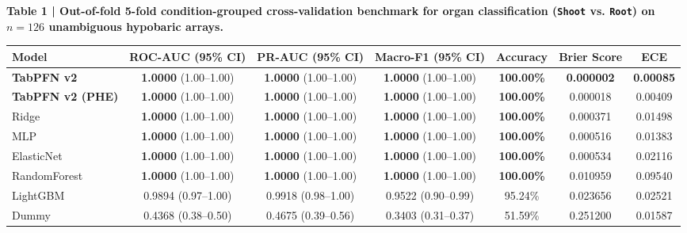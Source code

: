 \documentclass[10pt,a4paper]{article}
\begin{document}
\begin{center}
\small
\textbf{\textsf{Table 1 \;|\; Out-of-fold 5-fold condition-grouped cross-validation benchmark for organ classification (\texttt{Shoot} vs. \texttt{Root}) on $n = 126$ unambiguous hypobaric arrays.}}\\[6pt]
\begin{tabular}{lcccccc}
\toprule
\textbf{Model} & \textbf{ROC-AUC} (95\% CI) & \textbf{PR-AUC} (95\% CI) & \textbf{Macro-F1} (95\% CI) & \textbf{Accuracy} & \textbf{Brier Score} & \textbf{ECE} \\
\midrule
\textbf{TabPFN v2} & \textbf{1.0000} (1.00--1.00) & \textbf{1.0000} (1.00--1.00) & \textbf{1.0000} (1.00--1.00) & \textbf{100.00\%} & \textbf{0.000002} & \textbf{0.00085} \\
\textbf{TabPFN v2 (PHE)} & \textbf{1.0000} (1.00--1.00) & \textbf{1.0000} (1.00--1.00) & \textbf{1.0000} (1.00--1.00) & \textbf{100.00\%} & 0.000018 & 0.00409 \\
Ridge & \textbf{1.0000} (1.00--1.00) & \textbf{1.0000} (1.00--1.00) & \textbf{1.0000} (1.00--1.00) & \textbf{100.00\%} & 0.000371 & 0.01498 \\
MLP & \textbf{1.0000} (1.00--1.00) & \textbf{1.0000} (1.00--1.00) & \textbf{1.0000} (1.00--1.00) & \textbf{100.00\%} & 0.000516 & 0.01383 \\
ElasticNet & \textbf{1.0000} (1.00--1.00) & \textbf{1.0000} (1.00--1.00) & \textbf{1.0000} (1.00--1.00) & \textbf{100.00\%} & 0.000534 & 0.02116 \\
RandomForest & \textbf{1.0000} (1.00--1.00) & \textbf{1.0000} (1.00--1.00) & \textbf{1.0000} (1.00--1.00) & \textbf{100.00\%} & 0.010959 & 0.09540 \\
LightGBM & 0.9894 (0.97--1.00) & 0.9918 (0.98--1.00) & 0.9522 (0.90--0.99) & 95.24\% & 0.023656 & 0.02521 \\
Dummy & 0.4368 (0.38--0.50) & 0.4675 (0.39--0.56) & 0.3403 (0.31--0.37) & 51.59\% & 0.251200 & 0.01587 \\
\bottomrule
\end{tabular}
\end{center}
\vspace{0.8cm}
\end{document}

